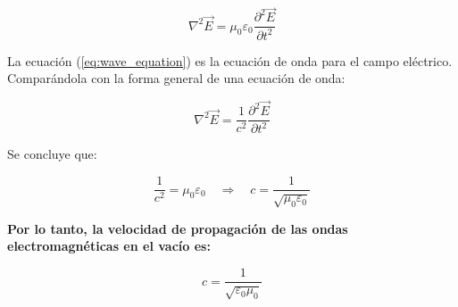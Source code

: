 \begin{equation}
	\nabla^2 \vec{E} = \mu_0 \varepsilon_0 \frac{\partial^2 \vec{E}}{\partial t^2} \label{eq:wave_equation}
\end{equation}

La ecuación (\ref{eq:wave_equation}) es la ecuación de onda para el campo eléctrico. Comparándola con la forma general de una ecuación de onda:

\[
\nabla^2 \vec{E} = \frac{1}{c^2} \frac{\partial^2 \vec{E}}{\partial t^2}
\]

Se concluye que:

\[
\frac{1}{c^2} = \mu_0 \varepsilon_0 \quad \Rightarrow \quad c = \frac{1}{\sqrt{\mu_0 \varepsilon_0}}
\]

\textbf{Por lo tanto, la velocidad de propagación de las ondas electromagnéticas en el vacío es:}

\[
c = \frac{1}{\sqrt{\varepsilon_0 \mu_0}}
\]
